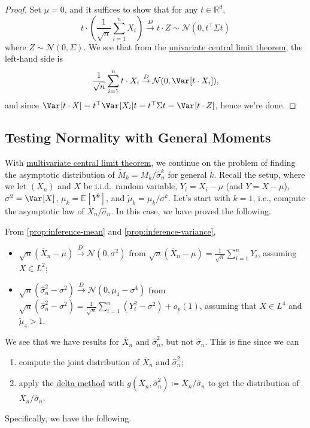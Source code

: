 \begin{proof}
	Set \(\mu = 0\), and it suffices to show that for any \(t \in \mathbb{R} ^d\),
	\[
		t \cdot \left( \frac{1}{\sqrt{n} } \sum_{i=1}^{n} X_i \right)
		\overset{D}{\to} t \cdot Z
		\sim \mathcal{N} (0, t ^{\top} \Sigma t)
	\]
	where \(Z \sim \mathcal{N} (0, \Sigma )\). We see that from the \hyperref[thm:CLT]{univariate central limit theorem}, the left-hand side is
	\[
		\frac{1}{\sqrt{n} } \sum_{i=1}^{n} t \cdot X_i
		\overset{D}{\to} \mathcal{N} (0, \Var_{}[t\cdot X_i] ),
	\]
	and since \(\Var_{}[t \cdot X] = t^{\top} \Var_{}[X_i] t = t ^{\top} \Sigma t = \Var_{}[t \cdot Z] \), hence we're done.
\end{proof}

\subsection{Testing Normality with General Moments}
With \hyperref[thm:multivariate-CLT]{multivariate central limit theorem}, we continue on the problem of finding the asymptotic distribution of \(\widetilde{M} _k = M_k / \hat{\sigma} _n^k\) for general \(k\). Recall the setup, where we let \((X_n)\) and \(X\) be i.i.d.\ random variable, \(Y_i = X_i - \mu \) (and \(Y = X - \mu \)), \(\sigma ^2 = \Var_{}[X] \), \(\mu _k = \mathbb{E}_{}[Y^k] \), and \(\widetilde{\mu} _k = \mu _k / \sigma ^k\). Let's start with \(k = 1\), i.e., compute the asymptotic law of \(\overline{X} _n / \hat{\sigma} _n\). In this case, we have proved the following.

\begin{prev}
	From \autoref{prop:inference-mean} and \autoref{prop:inference-variance},
	\begin{itemize}
		\item \(\sqrt{n} (\overline{X} _n - \mu ) \overset{D}{\to} \mathcal{N} (0, \sigma ^2)\) from \(\sqrt{n} (\overline{X} _n - \mu ) = \frac{1}{\sqrt{n} } \sum_{i=1}^{n} Y_i\), assuming \(X \in L^2\);
		\item \(\sqrt{n} (\hat{\sigma} _n^2 - \sigma ^2) \overset{D}{\to} \mathcal{N} (0, \mu _4 - \sigma ^4) \) from \(\sqrt{n} (\hat{\sigma} _n^2 - \sigma ^2) = \frac{1}{\sqrt{n} } \sum_{i=1}^{n} (Y_i^2 - \sigma ^2) + o_p(1)\), assuming that \(X \in L^4\) and \(\widetilde{\mu} _4 > 1\).
	\end{itemize}
\end{prev}

We see that we have results for \(\overline{X} _n\) and \(\hat{\sigma} _n^2\), but not \(\hat{\sigma} _n\). This is fine since we can
\begin{enumerate}
	\item compute the joint distribution of \(\overline{X} _n\) and \(\hat{\sigma} _n^2\);
	\item apply the \hyperref[thm:delta-method]{delta method} with \(g(\overline{X} _n , \hat{\sigma} _ n^2) \coloneqq \overline{X} _n / \hat{\sigma} _n\) to get the distribution of \(\overline{X} _n / \hat{\sigma} _n\).
\end{enumerate}
Specifically, we have the following.

